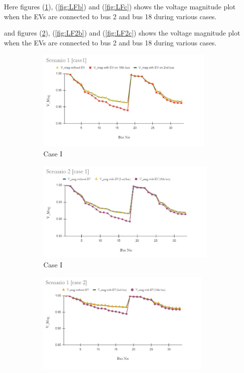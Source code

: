 	\noindent Here figures (\ref{fig:LFa}), (\ref{fig:LFb}) and  (\ref{fig:LFc}) shows the voltage magnitude plot when the EVs are connected to bus 2 and bus 18 during various cases.

	\noindent and figures (\ref{fig:LF2a}), (\ref{fig:LF2b}) and  (\ref{fig:LF2c}) shows the voltage magnitude plot when the EVs are connected to bus 2 and bus 18 during various cases.
	
	 \begin{figure}[!h]
		\begin{subfigure}{.5\textwidth}
			\centering
			\includegraphics[width=.97\linewidth,height= 4.95cm]{./Figures/sc1_case1}  
			\caption{Case I}
			\label{fig:LFa}
		\end{subfigure}
		\begin{subfigure}{.5\textwidth}
			\centering
			\includegraphics[width=.97\linewidth,height= 4.95cm]{./Figures/sc2_case1}  
			\caption{Case I}
			\label{fig:LF2a}
		\end{subfigure}
		\begin{subfigure}{.5\textwidth}
			\centering
			\includegraphics[width=.97\linewidth,height= 4.95cm]{./Figures/sc1_case2}

\end{subfigure}
\end{figure}
